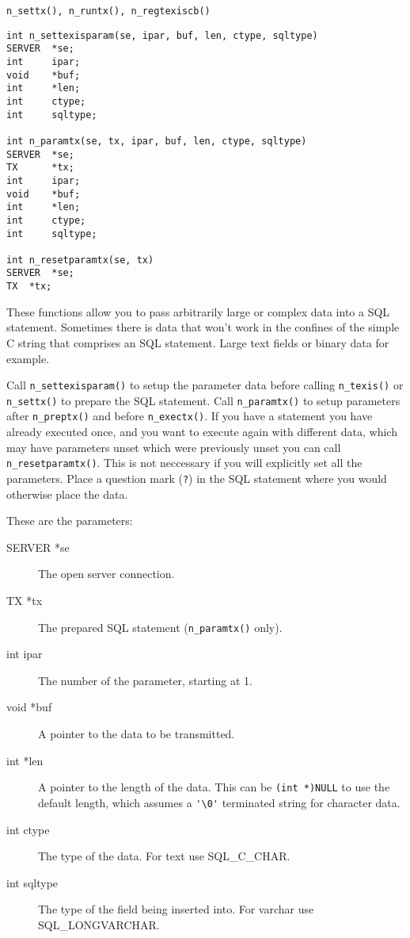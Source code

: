 \SEE
\begin{verbatim}
n_settx(), n_runtx(), n_regtexiscb()
\end{verbatim}


\SYNOPSIS
\begin{verbatim}
int n_settexisparam(se, ipar, buf, len, ctype, sqltype)
SERVER  *se;
int     ipar;
void    *buf;
int     *len;
int     ctype;
int     sqltype;

int n_paramtx(se, tx, ipar, buf, len, ctype, sqltype)
SERVER  *se;
TX      *tx;
int     ipar;
void    *buf;
int     *len;
int     ctype;
int     sqltype;

int n_resetparamtx(se, tx)
SERVER	*se;
TX	*tx;
\end{verbatim}

\DESCRIPTION

These functions allow you to pass arbitrarily large or complex data into
a SQL statement. Sometimes there is data that won't work in the confines
of the simple C string that comprises an SQL statement. Large text fields
or binary data for example.

Call \verb`n_settexisparam()` to setup the parameter data before calling
\verb`n_texis()` or \verb`n_settx()` to prepare the SQL statement.
Call \verb`n_paramtx()` to setup parameters after \verb`n_preptx()` and
before \verb`n_exectx()`.  If you have a statement you have already
executed once, and you want to execute again with different data, which
may have parameters unset which were previously unset you can call
\verb`n_resetparamtx()`.  This is not neccessary if you will explicitly
set all the parameters.
Place a question mark (\verb`?`) in the SQL statement where you would
otherwise place the data.

These are the parameters:
\begin{description}
\item[SERVER *se]      The open server connection.
\item[TX     *tx]      The prepared SQL statement (\verb`n_paramtx()` only).
\item[int     ipar]    The number of the parameter, starting at 1.
\item[void   *buf]     A pointer to the data to be transmitted.
\item[int    *len]     A pointer to the length of the data.  This can be
                       \verb`(int *)NULL` to use the default length, which
                       assumes a \verb`'\0'` terminated string for
                       character data.
\item[int     ctype]   The type of the data.  For text use SQL\_C\_CHAR.
\item[int     sqltype] The type of the field being inserted into.  For
                       varchar use SQL\_LONGVARCHAR.
\end{description}

